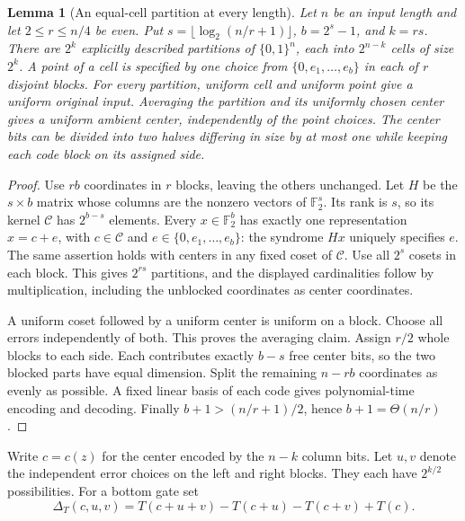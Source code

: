 \documentclass[11pt,letterpaper]{article}
\newtheorem{lemma}[theorem]{Lemma}
\theoremstyle{definition}
\theoremstyle{remark}
\newcommand{\F}{\mathbb F}
\begin{document}
\begin{lemma}[An equal-cell partition at every length]
\label{star:partition}
Let $n$ be an input length and let $2\le r\le n/4$ be even. Put
$s=\lfloor\log_2(n/r+1)\rfloor$, $b=2^s-1$, and $k=rs$.
There are $2^k$ explicitly described partitions of $\{0,1\}^n$, each
into $2^{n-k}$ cells of size $2^k$. A point of a cell is specified by
one choice from $\{0,e_1,\ldots,e_b\}$ in each of $r$ disjoint blocks.
For every partition, uniform cell and uniform point give a uniform
original input. Averaging the partition and its uniformly chosen center
gives a uniform ambient center, independently of the point choices.
The center bits can be divided into two halves differing in size by at
most one while keeping each code block on its assigned side.
\end{lemma}
\begin{proof}
Use $rb$ coordinates in $r$ blocks, leaving the others unchanged.
Let $H$ be the $s\times b$ matrix whose columns are the nonzero vectors
of $\F_2^s$. Its rank is $s$, so its kernel $\mathcal C$ has
$2^{b-s}$ elements. Every $x\in\F_2^b$ has exactly one representation
$x=c+e$, with $c\in\mathcal C$ and
$e\in\{0,e_1,\ldots,e_b\}$: the syndrome $Hx$ uniquely specifies $e$.
The same assertion holds with centers in any fixed coset of $\mathcal C$.
Use all $2^s$ cosets in each block. This gives $2^{rs}$ partitions,
and the displayed cardinalities follow by multiplication, including the
unblocked coordinates as center coordinates.

A uniform coset followed by a uniform center is uniform on a block.
Choose all errors independently of both. This proves the averaging
claim. Assign $r/2$ whole blocks to each side. Each contributes exactly
$b-s$ free center bits, so the two blocked parts have equal dimension.
Split the remaining $n-rb$ coordinates as evenly as possible. A fixed
linear basis of each code gives polynomial-time encoding and decoding.
Finally $b+1> (n/r+1)/2$, hence $b+1=\Theta(n/r)$.
\end{proof}

Write $c=c(z)$ for the center encoded by the $n-k$ column bits. Let
$u,v$ denote the independent error choices on the left and right blocks.
They each have $2^{k/2}$ possibilities. For a bottom gate set
\begin{equation}
\Delta_T(c,u,v)=T(c+u+v)-T(c+u)-T(c+v)+T(c).
\label{star:delta}
\end{equation}
\end{document}
